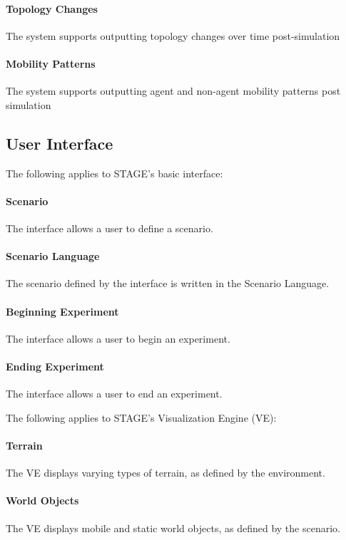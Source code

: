 \documentclass[titlepage]{article}
\begin{document}
	\paragraph{Topology Changes} The system supports outputting topology changes over time post-simulation
	\paragraph{Mobility Patterns} The system supports outputting agent and non-agent mobility patterns post simulation


\subsection{User Interface%
  \label{user-interface}%
}

The following applies to STAGE's basic interface:
    \paragraph{Scenario} The interface allows a user to define a scenario.
    \paragraph{Scenario Language} The scenario defined by the interface is written in the Scenario Language.
    \paragraph{Beginning Experiment} The interface allows a user to begin an experiment.
    \paragraph{Ending Experiment} The interface allows a user to end an experiment.

The following applies to STAGE's Visualization Engine (VE):
    \paragraph{Terrain} The VE displays varying types of terrain, as defined by the environment.
    \paragraph{World Objects} The VE displays mobile and static world objects, as defined by the scenario.
\end{document}
